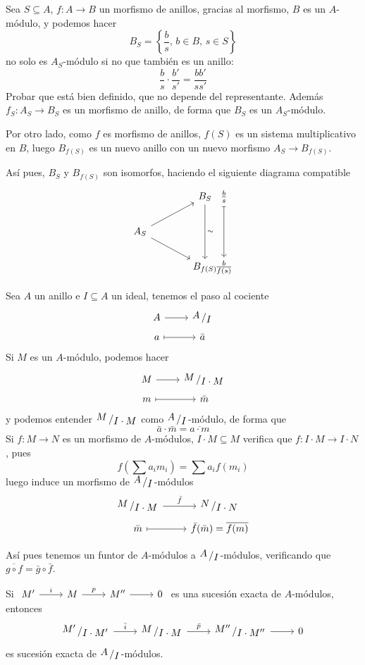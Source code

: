 \begin{ejer}
    Sea $S\subseteq A$, $f:A \longrightarrow B$ un morfismo de anillos, gracias al morfismo, $B$ es un $A$-m\'odulo, y podemos hacer
    $$B_S = \left\{ \frac{b}{s} , \, b\in B, \, s\in S \right\}$$
    no solo es $A_S$-m\'odulo si no que tambi\'en es un anillo:
    $$\frac{b}{s} \cdot \frac{b'}{s'} = \frac{bb'}{ss'}$$
    Probar que est\'a bien definido, que no depende del representante. Adem\'as $f_S : A_S\longrightarrow B_S$ es un morfismo de anillo, de forma que $B_S$ es un $A_S$-m\'odulo.

    Por otro lado, como $f$ es morfismo de anillos, $f(S)$ es un sistema multiplicativo en $B$, luego $B_{f(S)}$ es un nuevo anillo con un nuevo morfismo $A_S \longrightarrow B_{f(S)}$. 

    As\'i pues, $B_S$ y $B_{f(S)}$ son isomorfos, haciendo el siguiente diagrama compatible
    $$\bt &[5mm] B_S \arrow{dd}{\sim} &[-12mm] \frac{b}{s} \arrow[mapsto]{dd} \\ A_S \arrow{ru} \arrow{rd} &[5mm] &[-12mm]  \\ &[5mm] B_{f(S)} &[-12mm] \frac{b}{f(s)} \et$$
\end{ejer}
\begin{propis}
    Sea $A$ un anillo e $I\subseteq A$ un ideal, tenemos el paso al cociente
    $$\bt A \arrow{r} & \modulo{A}{I} \\[-5mm] a \arrow[mapsto]{r} & \bar a \et$$
    Si $M$ es un $A$-m\'odulo, podemos hacer
    $$\bt M \arrow{r} & \modulo{M}{I\cdot M} \\[-5mm] m \arrow[mapsto]{r} & \bar m \et$$
    y podemos entender $\modulo{M}{I\cdot M}$ como $\modulo{A}{I}$-m\'odulo, de forma que 
    $$\bar a \cdot \bar m = \overline{a\cdot m}$$
    Si $f:M \longrightarrow N$ es un morfismo de $A$-m\'odulos, $I\cdot M \subseteq M$ verifica que $f:I\cdot M \longrightarrow I\cdot N$, pues
    $$f\left(\sum a_i m_i \right) = \sum a_i f(m_i)$$
    luego induce un morfismo de $\modulo{A}{I}$-m\'odulos $$\bt \modulo{M}{I\cdot M} \arrow{r}{\bar f} & \modulo{N}{I\cdot N} \\[-5mm] \bar m \arrow[mapsto]{r} & \bar f (\bar m) = \overline{f(m)} \et$$

    As\'i pues tenemos un funtor de $A$-m\'odulos a $\modulo{A}{I}$-m\'odulos, verificando que $\overline{g\circ f} = \bar g \circ \bar f$.
\end{propis}
\begin{prop}
    Si $\bt M' \arrow{r}{i} & M \arrow{r}{p} & M'' \arrow{r} & 0  \et$ es una sucesi\'on exacta de $A$-m\'odulos, entonces
    $$\bt \modulo{M'}{I\cdot M'} \arrow{r}{\bar i} & \modulo{M}{I\cdot M} \arrow{r}{\bar p} & \modulo{M''}{I\cdot M''} \arrow{r} & 0  \et$$ es sucesi\'on exacta de $\modulo{A}{I}$-m\'odulos. \end{prop}
